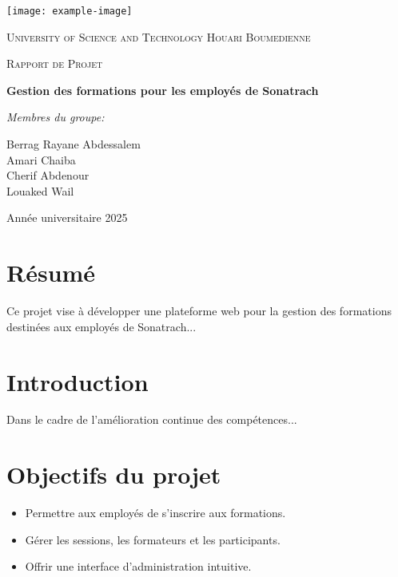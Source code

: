 \documentclass[12pt,a4paper]{report}
\begin{document}
\begin{titlepage}
    \centering
    \texttt{[image: example-image]}~\\[1cm]

    {\scshape\LARGE University of Science and Technology Houari Boumedienne \par}
    \vspace{1.5cm}
    {\scshape\Large Rapport de Projet\par}
    \vspace{1.5cm}
    {\huge\bfseries Gestion des formations pour les employés de Sonatrach\par}
    \vspace{2cm}
    {\Large\itshape Membres du groupe: \par}
    \vspace{0.5cm}
    Berrag Rayane Abdessalem\\
    Amari Chaiba\\
    Cherif Abdenour\\
    Louaked Wail\\
    \vfill
    {\Large Année universitaire 2025\par}
\end{titlepage}

\tableofcontents
\newpage

\chapter*{Résumé}
Ce projet vise à développer une plateforme web pour la gestion des formations destinées aux employés de Sonatrach...

\chapter{Introduction}
Dans le cadre de l'amélioration continue des compétences...

\chapter{Objectifs du projet}
\begin{itemize}
    \item Permettre aux employés de s'inscrire aux formations.
    \item Gérer les sessions, les formateurs et les participants.
    \item Offrir une interface d'administration intuitive.
\end{itemize}
\end{document}
